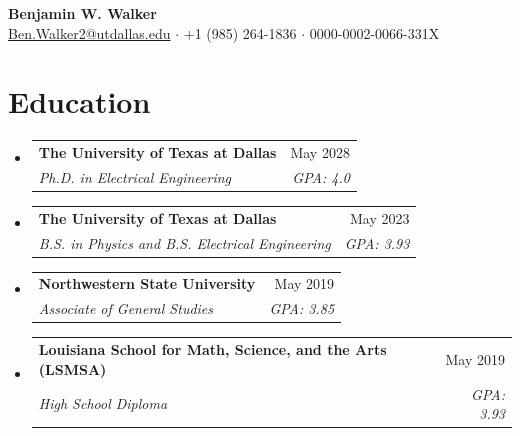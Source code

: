 \documentclass[letterpaper,11pt]{article}
\makeatletter
\newcommand{\resumeSubheading}[4]{
  \vspace{-2pt}\item
    \begin{tabular*}{0.97\textwidth}[t]{l@{\extracolsep{\fill}}r}
      \textbf{#1} & #2 \\
      \textit{\small#3} & \textit{\small #4} \\
    \end{tabular*}\vspace{-7pt}
}
\newcommand{\resumeSubHeadingListStart}{\begin{itemize}[leftmargin=0.15in, label={}]}
\newcommand{\resumeSubHeadingListEnd}{\end{itemize}}
\makeatother
\begin{document}
\begin{center}
    \textbf{\Large Benjamin W. Walker} \\ \vspace{5pt}
    \href{mailto:Ben.Walker2@utdallas.edu}{{Ben.Walker2@utdallas.edu}} 
    \hspace{1 pt} $\cdot$ \hspace{1 pt}
    +1 (985) 264-1836
    \hspace{1 pt} $\cdot$ \hspace{1 pt}
    0000-0002-0066-331X 
    \vspace{-10pt}
\end{center}

\vspace{-10pt}


\section{Education}
  \resumeSubHeadingListStart
  \resumeSubheading
      {The University of Texas at Dallas}{May 2028}
      {Ph.D. in Electrical Engineering}{GPA: 4.0}
    \resumeSubheading
      {The University of Texas at Dallas}{May 2023}
      {B.S. in Physics and B.S. Electrical Engineering}{GPA: 3.93}
    \resumeSubheading
      {Northwestern State University}{May 2019}
      {Associate of General Studies}{GPA: 3.85}
    \resumeSubheading
    {Louisiana School for Math, Science, and the Arts \normalfont(LSMSA)}{May 2019}
    {High School Diploma}{GPA: 3.93}
  \resumeSubHeadingListEnd
\end{document}
